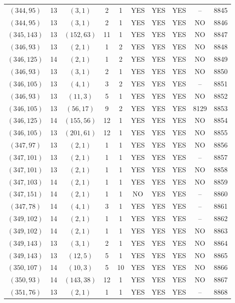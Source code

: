 \begin{longtable}{|c|c|c|c|c|c|c|c|c|c|}
$(344, 95)$ & 13 & $(3, 1)$ & 2 & 1 & YES & YES & YES & -- & 8845\\
$(344, 95)$ & 13 & $(3, 1)$ & 2 & 1 & YES & YES & YES & NO & 8846\\
$(345, 143)$ & 13 & $(152, 63)$ & 11 & 1 & YES & YES & YES & NO & 8847\\
$(346, 93)$ & 13 & $(2, 1)$ & 1 & 2 & YES & YES & YES & NO & 8848\\
$(346, 125)$ & 14 & $(2, 1)$ & 1 & 2 & YES & YES & YES & NO & 8849\\
$(346, 93)$ & 13 & $(3, 1)$ & 2 & 1 & YES & YES & YES & NO & 8850\\
$(346, 105)$ & 13 & $(4, 1)$ & 3 & 2 & YES & YES & YES & -- & 8851\\
$(346, 93)$ & 13 & $(11, 3)$ & 5 & 1 & YES & YES & YES & NO & 8852\\
$(346, 105)$ & 13 & $(56, 17)$ & 9 & 2 & YES & YES & YES & 8129 & 8853\\
$(346, 125)$ & 14 & $(155, 56)$ & 12 & 1 & YES & YES & YES & NO & 8854\\
$(346, 105)$ & 13 & $(201, 61)$ & 12 & 1 & YES & YES & YES & NO & 8855\\
$(347, 97)$ & 13 & $(2, 1)$ & 1 & 1 & YES & YES & YES & NO & 8856\\
$(347, 101)$ & 13 & $(2, 1)$ & 1 & 1 & YES & YES & YES & -- & 8857\\
$(347, 101)$ & 13 & $(2, 1)$ & 1 & 1 & YES & YES & YES & NO & 8858\\
$(347, 103)$ & 14 & $(2, 1)$ & 1 & 1 & YES & YES & YES & NO & 8859\\
$(347, 151)$ & 14 & $(2, 1)$ & 1 & 1 & NO & YES & YES & -- & 8860\\
$(347, 78)$ & 14 & $(4, 1)$ & 3 & 1 & YES & YES & YES & -- & 8861\\
$(349, 102)$ & 14 & $(2, 1)$ & 1 & 1 & YES & YES & YES & -- & 8862\\
$(349, 102)$ & 14 & $(2, 1)$ & 1 & 1 & YES & YES & YES & NO & 8863\\
$(349, 143)$ & 13 & $(3, 1)$ & 2 & 1 & YES & YES & YES & NO & 8864\\
$(349, 143)$ & 13 & $(12, 5)$ & 5 & 1 & YES & YES & YES & NO & 8865\\
$(350, 107)$ & 14 & $(10, 3)$ & 5 & 10 & YES & YES & YES & NO & 8866\\
$(350, 93)$ & 14 & $(143, 38)$ & 12 & 1 & YES & YES & YES & NO & 8867\\
$(351, 76)$ & 13 & $(2, 1)$ & 1 & 1 & YES & YES & YES & -- & 8868\\

\end{longtable}
